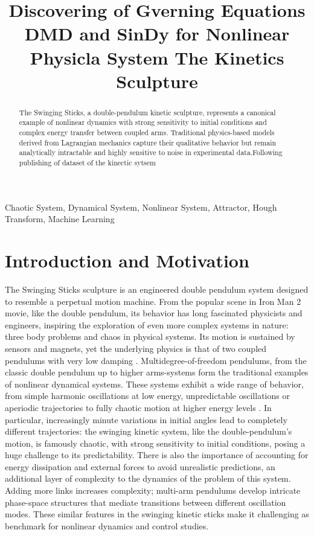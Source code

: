\documentclass[letterpaper, 10pt, conference]{IEEEtran}
\title{\LARGE \bf
    Discovering of Gverning Equations DMD and SinDy for Nonlinear Physicla System The Kinetics Sculpture}
\author{
    \IEEEauthorblockN{Justice V.~Essuman, Alhamduhaha Boker, Leonard Smith}
    \IEEEauthorblockA{Department of Electrical and Computer Engineering, Virginia Tech, Blacksburg, VA, USA\\
    justiceve@vt.edu, bokerece@vt.edu, lsmith@vt.edu}
    }
\begin{document}
    
    \maketitle
    \thispagestyle{empty}
    \pagestyle{empty}

    
    \begin{abstract}
        The Swinging Sticks, a double-pendulum kinetic sculpture, represents a canonical example of nonlinear dynamics with strong sensitivity to initial conditions and complex energy transfer between coupled arms. Traditional physics-based models derived from Lagrangian mechanics capture their qualitative behavior but remain analytically intractable and highly sensitive to noise in experimental data.Following publishing of dataset of the kinectic sytsem
    \end{abstract}

    \begin{IEEEkeywords}
    Chaotic System, Dynamical System, Nonlinear System, Attractor, Hough Transform, Machine Learning
    \end{IEEEkeywords}

    \section{Introduction and Motivation}
    
        The Swinging Sticks sculpture is an engineered double pendulum system designed to resemble a perpetual motion machine. From the popular scene in Iron Man 2 movie, like the double pendulum, its behavior has long fascinated physicists and engineers, inspiring the exploration of even more complex systems in nature: three body problems and chaos in physical systems. Its motion is sustained by sensors and magnets, yet the underlying physics is that of two coupled pendulums with very low damping \cite{noauthor_swinging_2022}. Multidegree-of-freedom pendulums, from the classic double pendulum up to higher arms-systems form the traditional examples of nonlinear dynamical systems. These systems exhibit a wide range of behavior, from simple harmonic oscillations at low energy, unpredictable oscillations or aperiodic trajectories to fully chaotic motion at higher energy levels \cite{kaheman_experimental_2022}. In particular, increasingly minute variations in initial angles lead to completely different trajectories: the swinging kinetic system, like the double-pendulum's motion, is famously chaotic, with strong sensitivity to initial conditions, posing a huge challenge to its predictability. There is also the importance of accounting for energy dissipation and external forces to avoid unrealistic predictions, an additional layer of complexity to the dynamics of the problem of this system. Adding more links increases complexity; multi-arm pendulums develop intricate phase-space structures that mediate transitions between different oscillation modes. These similar features in the swinging kinetic sticks make it challenging as benchmark for nonlinear dynamics and control studies.
\end{document}
